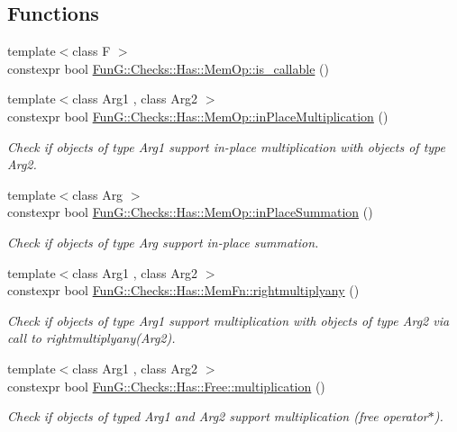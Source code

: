 \subsection*{Functions}
\begin{DoxyCompactItemize}
\item 
{\footnotesize template$<$class F $>$ }\\constexpr bool \hyperlink{namespaceFunG_1_1Checks_1_1Has_1_1MemOp_a5810c07eff37faaf76b881548a6722bd}{Fun\+G\+::\+Checks\+::\+Has\+::\+Mem\+Op\+::is\+\_\+callable} ()
\item 
{\footnotesize template$<$class Arg1 , class Arg2 $>$ }\\constexpr bool \hyperlink{namespaceFunG_1_1Checks_1_1Has_1_1MemOp_ae8e502928ebc6342cab98ebbb62b8802}{Fun\+G\+::\+Checks\+::\+Has\+::\+Mem\+Op\+::in\+Place\+Multiplication} ()
\begin{DoxyCompactList}\small\item\em Check if objects of type Arg1 support in-\/place multiplication with objects of type Arg2. \end{DoxyCompactList}\item 
{\footnotesize template$<$class Arg $>$ }\\constexpr bool \hyperlink{namespaceFunG_1_1Checks_1_1Has_1_1MemOp_a23052f7d8da399943f6354a7d477c825}{Fun\+G\+::\+Checks\+::\+Has\+::\+Mem\+Op\+::in\+Place\+Summation} ()
\begin{DoxyCompactList}\small\item\em Check if objects of type Arg support in-\/place summation. \end{DoxyCompactList}\item 
{\footnotesize template$<$class Arg1 , class Arg2 $>$ }\\constexpr bool \hyperlink{namespaceFunG_1_1Checks_1_1Has_1_1MemFn_adeb3d401c6464514644930596c3a4ccc}{Fun\+G\+::\+Checks\+::\+Has\+::\+Mem\+Fn\+::rightmultiplyany} ()
\begin{DoxyCompactList}\small\item\em Check if objects of type Arg1 support multiplication with objects of type Arg2 via call to rightmultiplyany(\+Arg2). \end{DoxyCompactList}\item 
{\footnotesize template$<$class Arg1 , class Arg2 $>$ }\\constexpr bool \hyperlink{namespaceFunG_1_1Checks_1_1Has_1_1Free_a2454bd1f5873cc86ec31d09d822a67b1}{Fun\+G\+::\+Checks\+::\+Has\+::\+Free\+::multiplication} ()
\begin{DoxyCompactList}\small\item\em Check if objects of typed Arg1 and Arg2 support multiplication (free operator$\ast$). \end{DoxyCompactList}\item 

\end{DoxyCompactItemize}
